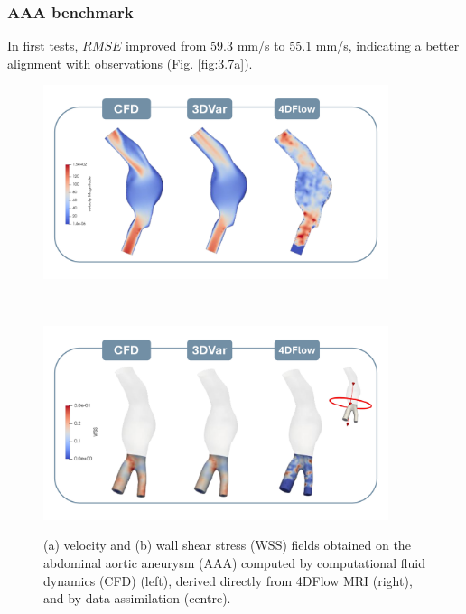 \subsubsection*{AAA benchmark}
In first tests, \(RMSE\) improved from 59.3 mm/s to 55.1 mm/s, indicating a better alignment with observations (Fig. \ref{fig:3.7a}). 
\begin{figure}
    \centering
    \begin{minipage}{\textwidth}
        \centering
        \includegraphics[width=0.9\textwidth]{chapters/paratico/Fig1.3a.pdf}
        \label{fig:3.7a}
    \end{minipage}
    \\[1em]  
    \begin{minipage}{\textwidth}
        \centering
        \includegraphics[width=0.9\textwidth]{chapters/paratico/Fig1.3b.pdf}
        \label{fig:3.7b}
    \end{minipage}
    \caption{\small (a) velocity and (b) wall shear stress (WSS) fields obtained on the abdominal aortic aneurysm (AAA) computed by computational fluid dynamics (CFD) (left), derived directly from 4DFlow MRI (right), and by data assimilation (centre).}
    \label{fig:3.7}
\end{figure}

